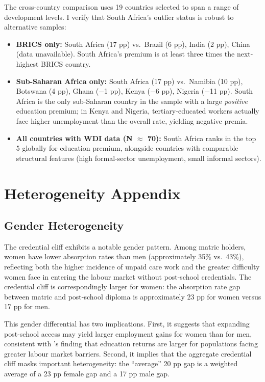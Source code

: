 \documentclass[12pt]{article}
\begin{document}
The cross-country comparison uses 19 countries selected to span a range of development levels. I verify that South Africa's outlier status is robust to alternative samples:
\begin{itemize}
    \item \textbf{BRICS only:} South Africa (17 pp) vs.\ Brazil (6 pp), India (2 pp), China (data unavailable). South Africa's premium is at least three times the next-highest BRICS country.
    \item \textbf{Sub-Saharan Africa only:} South Africa (17 pp) vs.\ Namibia (10 pp), Botswana (4 pp), Ghana ($-$1 pp), Kenya ($-$6 pp), Nigeria ($-$11 pp). South Africa is the only sub-Saharan country in the sample with a large \emph{positive} education premium; in Kenya and Nigeria, tertiary-educated workers actually face higher unemployment than the overall rate, yielding negative premia.
    \item \textbf{All countries with WDI data (N $\approx$ 70):} South Africa ranks in the top 5 globally for education premium, alongside countries with comparable structural features (high formal-sector unemployment, small informal sectors).
\end{itemize}


\section{Heterogeneity Appendix}
\label{sec:app_het}

\subsection{Gender Heterogeneity}

The credential cliff exhibits a notable gender pattern. Among matric holders, women have lower absorption rates than men (approximately 35\% vs.\ 43\%), reflecting both the higher incidence of unpaid care work and the greater difficulty women face in entering the labour market without post-school credentials. The credential cliff is correspondingly larger for women: the absorption rate gap between matric and post-school diploma is approximately 23 pp for women versus 17 pp for men.

This gender differential has two implications. First, it suggests that expanding post-school access may yield larger employment gains for women than for men, consistent with \citet{duflo2001schooling}'s finding that education returns are larger for populations facing greater labour market barriers. Second, it implies that the aggregate credential cliff masks important heterogeneity: the ``average'' 20 pp gap is a weighted average of a 23 pp female gap and a 17 pp male gap.
\end{document}
